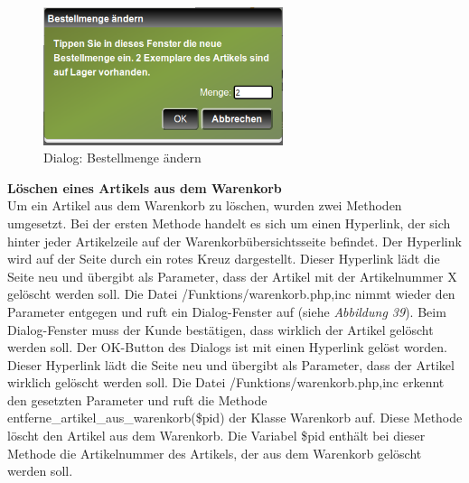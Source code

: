 \begin{figure}[H]
	\begin{center}
			\includegraphics[width=70mm]{Bilder/mengenaenderung.png}
	\end{center}
	\caption{Dialog: Bestellmenge ändern}
\end{figure}

\textbf{Löschen eines Artikels aus dem Warenkorb}\\
Um ein Artikel aus dem Warenkorb zu löschen, wurden zwei Methoden umgesetzt. Bei der ersten Methode handelt es sich um einen Hyperlink, der sich hinter jeder Artikelzeile auf der Warenkorbübersichtsseite befindet. Der Hyperlink wird auf der Seite durch ein rotes Kreuz dargestellt. Dieser Hyperlink lädt die Seite neu und übergibt als Parameter, dass der Artikel mit der Artikelnummer X gelöscht werden soll. Die Datei \glqq /Funktions/warenkorb.php,inc\grqq{} nimmt wieder den Parameter entgegen und ruft ein Dialog-Fenster auf (siehe \textit{Abbildung 39}). Beim Dialog-Fenster muss der Kunde bestätigen, dass wirklich der Artikel gelöscht werden soll. Der \glqq OK-Button\grqq{} des Dialogs ist mit einen Hyperlink gelöst worden. Dieser Hyperlink lädt die Seite neu und übergibt als Parameter, dass der Artikel wirklich gelöscht werden soll. Die Datei \glqq /Funktions/warenkorb.php,inc\grqq{} erkennt den gesetzten Parameter und ruft die Methode \glqq entferne\_artikel\_aus\_warenkorb(\$pid)\grqq{} der Klasse \glqq Warenkorb\grqq{} auf. Diese Methode löscht den Artikel aus dem Warenkorb. Die Variabel \glqq \$pid\grqq{} enthält bei dieser Methode die Artikelnummer des Artikels, der aus dem Warenkorb gelöscht werden soll.\\
